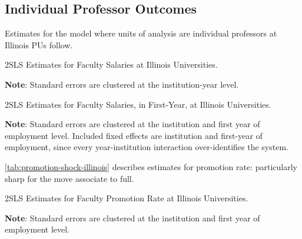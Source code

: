 \documentclass[notitlepage,12pt]{article}
\begin{document}
\subsection{Individual Professor Outcomes}

Estimates for the model where units of analysis are individual professors at Illinois PUs follow.

\begin{table}[!h]
    \onehalfspacing
    \centering
    \caption{2SLS Estimates for Faculty Salaries at Illinois Universities.}
    \makebox[\textwidth][c]{}
    \begin{flushleft}
        \footnotesize
        \textbf{Note}: Standard errors are clustered at the institution-year level.
    \end{flushleft}
    \label{tab:facultysalaries-shock-illinois}
\end{table}


\begin{table}[!h]
    \onehalfspacing
    \centering
    \caption{2SLS Estimates for Faculty Salaries, in First-Year, at Illinois Universities.}
    \makebox[\textwidth][c]{}
    \begin{flushleft}
        \footnotesize
        \textbf{Note}: Standard errors are clustered at the institution and first year of employment level.
        Included fixed effects are institution and first-year of employment, since every year-institution interaction over-identifies the system. 
    \end{flushleft}
    \label{tab:newhiresalaries-shock-illinois}
\end{table}

\autoref{tab:promotion-shock-illinois} describes estimates for promotion rate: particularly sharp for the move associate to full.

\begin{table}[!h]
    \onehalfspacing
    \centering
    \caption{2SLS Estimates for Faculty Promotion Rate at Illinois Universities.}
    \makebox[\textwidth][c]{}
    \begin{flushleft}
        \footnotesize
        \textbf{Note}: Standard errors are clustered at the institution and first year of employment level.
    \end{flushleft}
    \label{tab:promotion-shock-illinois}
\end{table}
\end{document}
